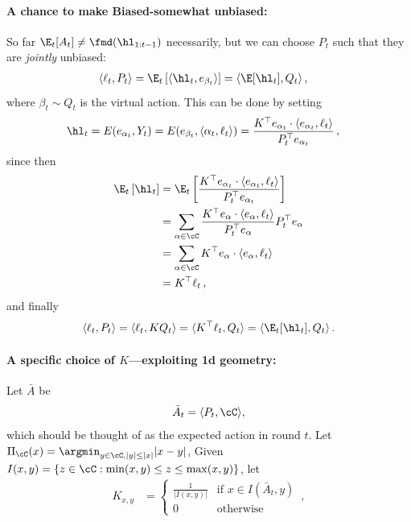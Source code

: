 \paragraph{A chance to make Biased-\smdalg somewhat unbiased:}
So far $\E_t[A_t] \neq \fmd(\hl_{1:t-1})$
necessarily, but we can choose $P_t$
such that they are \textit{jointly} unbiased:
\begin{align*}
    \langle \ell_t, P_t \rangle
     & =
    \E_t\left[\langle \hl_t, e_{\beta_t}\rangle\right]
    =
    \langle \E[\hl_t], Q_t \rangle\,,
\end{align*}
where $\beta_t \sim Q_t$ is the virtual action.
This can be done by setting
\begin{align*}
    \hl_t & = E(e_{\alpha_t}, Y_t)
    = E(e_{\beta_t}, \langle \alpha_t, \ell_t\rangle)
    = \frac{K^\top e_{\alpha_t} \cdot \langle e_{\alpha_t}, \ell_t\rangle}{
        P_t^\top e_{\alpha_t}
    }\,,
\end{align*}
since then
\begin{align*}
    \E_t\left[\hl_t\right]
     & =
    \E_t\left[
        \frac{K^\top e_{\alpha_t} \cdot \langle e_{\alpha_t}, \ell_t\rangle}{
            P_t^\top e_{\alpha_t}}
    \right] \\
     & =
    \sum_{\alpha \in \cC}
    \frac{K^\top e_{\alpha}
        \cdot \langle e_{\alpha}, \ell_t\rangle}{
        P_t^\top e_{\alpha}}
    P_t^\top e_{\alpha}
    \\
     & =
    \sum_{\alpha \in \cC}
    K^\top e_{\alpha}
    \cdot \langle e_{\alpha}, \ell_t\rangle
    \\
     & =
    K^\top \ell_t\,,
\end{align*}
and finally
\begin{align*}
    \langle \ell_t, P_t \rangle
    = \langle \ell_t, K Q_t \rangle
    = \langle K^\top \ell_t, Q_t \rangle
    = \langle \E_t[\hl_t], Q_t \rangle\,.
\end{align*}

\paragraph{A specific choice of $K$---exploiting 1d geometry:}
Let $\bar{A}$ be
\begin{align*}
    \bar{A}_t = \langle P_t, \cC \rangle,
\end{align*}
which should be thought of as the expected action in round $t$.
Let $\Pi_\cC(x) = \argmin_{y \in \cC, |y| \leq |x|} |x - y|$,
Given $I(x,y) = \{z \in \cC: \min(x,y) \leq z \leq \max(x,y)\}$,
let
\begin{align*}
    K_{x,y} & =
    \begin{cases}
        \frac{1}{|I(x,y)|} & \text{if } x\in I(\bar{A}_t, y) \\
        0                  & \text{otherwise}
    \end{cases}\,,
\end{align*}

